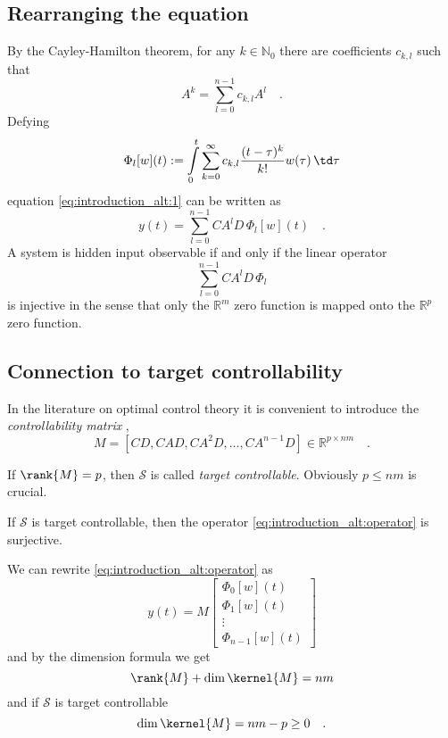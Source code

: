 \subsection*{Rearranging the equation}
By the Cayley-Hamilton theorem, for any $k\in\mathbb{N}_0$ there are coefficients $c_{k,l}$ 
such that 
\begin{equation}
A^k = \sum\limits_{l=0}^{n-1} c_{k,l} A^l \quad .
\end{equation}
Defying
\begin{equation}
\Phi_l[w](t) :=  \int\limits_0^t \sum\limits_{k=0}^\infty c_{k,l}\frac{(t-\tau)^k}{k!}  
w(\tau) \, \td\tau 
\end{equation}
equation \eqref{eq:introduction_alt:1} can be written as
\begin{equation}
y(t) = \sum\limits_{l=0}^{n-1} CA^lD \, \Phi_l[w](t)
\quad . \label{eq:introduction_alt:operator}
\end{equation}
A system is hidden input observable if and only if the linear operator
\begin{equation}
\sum\limits_{l=0}^{n-1} C A^l D \, \Phi_l
\end{equation}
is injective in the sense that only the $\mathbb{R}^m$ zero function is mapped onto 
the $\mathbb{R}^p$ zero function.

\subsection*{Connection to target controllability}
In the literature on optimal control theory it is convenient to introduce the 
\textit{controllability matrix} \cite{Luenberg},\cite{Barabasi_k-walk}
\begin{equation}
M = [CD,CAD,CA^2D,\ldots,CA^{n-1}D] \in \mathbb{R}^{p\times nm} \quad .
\end{equation}
\begin{definition}
If $\rank{M} = p$, then $\mathcal{S}$ is called \textit{target controllable}. 
Obviously $p\leq nm$ is crucial.
\end{definition}
\begin{proposition}
If $\mathcal{S}$ is target controllable, then the operator 
\eqref{eq:introduction_alt:operator} is surjective.
\end{proposition}
We can rewrite \eqref{eq:introduction_alt:operator} as
\begin{equation}
y(t) = M \begin{bmatrix}
\Phi_0[w](t) \\ \Phi_1[w](t) \\ \vdots \\ \Phi_{n-1}[w](t)
\end{bmatrix}
\end{equation}
and by the dimension formula we get
\begin{equation}
\rank{M} + \dim{\kernel{M}} = nm
\end{equation}
and if $\mathcal{S}$ is target controllable
\begin{equation}
\dim{\kernel{M}} = nm - p \geq 0 \quad .
\end{equation}

